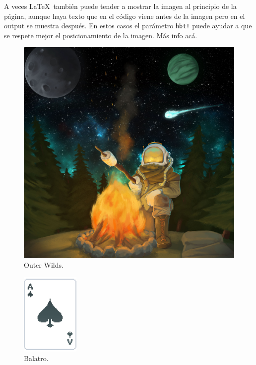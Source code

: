 \documentclass[12pt, spanish]{article}
\theoremstyle{definition} %
\theoremstyle{remark} %
\theoremstyle{plain} %
\theoremstyle{plain} %
\theoremstyle{plain} %
\theoremstyle{plain} %
\theoremstyle{plain} %
\theoremstyle{remark} %
\begin{document}
A veces \LaTeX\ también puede tender a mostrar la imagen al principio de la página, aunque haya texto que en el código viene antes de la imagen pero en el output se muestra después. En estos casos el parámetro \verb|hbt!| puede ayudar a que se respete mejor el posicionamiento de la imagen. Más info \href{https://www.overleaf.com/learn/latex/Questions/How_can_I_get_my_table_or_figure_to_stay_where_they_are\%2C_instead_of_going_to_the_next_page\%3F}{acá}.

\begin{figure}[hbt!]
    \begin{center}
        \includegraphics[scale=0.09]{imagenes/outer wilds.jpeg}
        \caption{Outer Wilds.}
        \label{fig:outer wilds}
    \end{center}
\end{figure}

\begin{figure}
  \begin{center}
    \includegraphics[width=0.25\textwidth]{imagenes/balatro.pdf}
  \caption{Balatro.}
  \end{center}
\end{figure}
\end{document}

